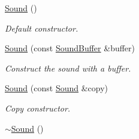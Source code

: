 \begin{DoxyCompactItemize}
\item 
\hypertarget{classsf_1_1_sound_a36ab74beaaa953d9879c933ddd246282}{\hyperlink{classsf_1_1_sound_a36ab74beaaa953d9879c933ddd246282}{Sound} ()}\label{classsf_1_1_sound_a36ab74beaaa953d9879c933ddd246282}

\begin{DoxyCompactList}\small\item\em Default constructor. \end{DoxyCompactList}\item 
\hyperlink{classsf_1_1_sound_a3b1cfc19a856d4ff8c079ee41bb78e69}{Sound} (const \hyperlink{classsf_1_1_sound_buffer}{Sound\+Buffer} \&buffer)
\begin{DoxyCompactList}\small\item\em Construct the sound with a buffer. \end{DoxyCompactList}\item 
\hyperlink{classsf_1_1_sound_ae05eeed6377932694d86b3011be366c0}{Sound} (const \hyperlink{classsf_1_1_sound}{Sound} \&copy)
\begin{DoxyCompactList}\small\item\em Copy constructor. \end{DoxyCompactList}\item 
\hypertarget{classsf_1_1_sound_ad0792c35310eba2dffd8489c80fad076}{\hyperlink{classsf_1_1_sound_ad0792c35310eba2dffd8489c80fad076}{$\sim$\+Sound} ()}\label{classsf_1_1_sound_ad0792c35310eba2dffd8489c80fad076}


\end{DoxyCompactItemize}
